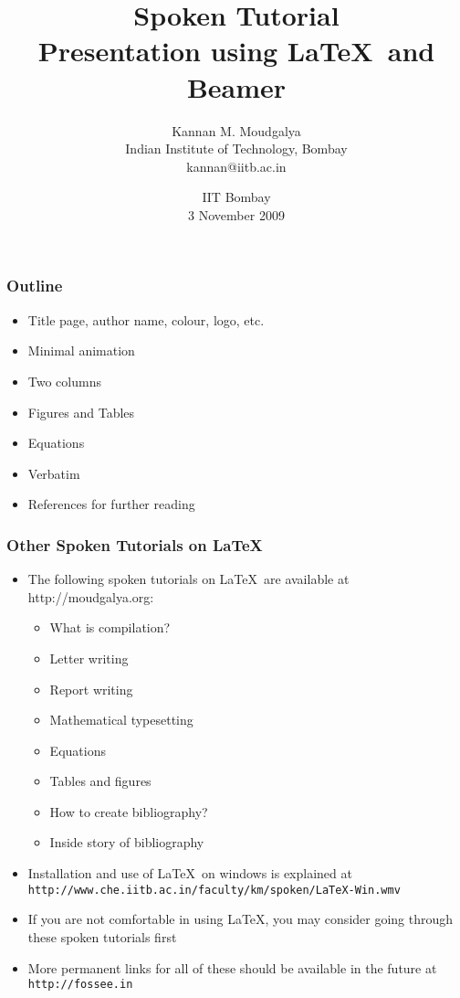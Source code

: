 \documentclass[]{beamer}
\begin{document}
\title
{Spoken Tutorial \\ Presentation using \LaTeX\ and
  Beamer}
\author
{Kannan M. Moudgalya \\
  Indian Institute of Technology, Bombay \\
  kannan@iitb.ac.in}
\date{IIT Bombay \\
  3 November 2009}

\begin{frame}
   \titlepage
\end{frame}

\begin{frame}
\frametitle{Outline}
\begin{itemize}
\item Title page, author name, colour, logo, etc.
\item Minimal animation
\item Two columns
\item Figures and Tables
\item Equations
\item Verbatim
\item References for further reading
\end{itemize}
\end{frame}

\begin{frame}
\frametitle{Other Spoken Tutorials on  \LaTeX}
\begin{itemize}
\item The following spoken tutorials
  on \LaTeX\ are available at
  {\color{magenta}http://moudgalya.org}:
\begin{itemize}
\item What is compilation?
\item Letter writing
\item Report writing
\item Mathematical typesetting
\item Equations
\item Tables and figures
\item How to create bibliography?
\item Inside story of bibliography
\end{itemize}
\item Installation and use of \LaTeX\ on windows
  is explained at
{\color{magenta} \small \tt http://www.che.iitb.ac.in/faculty/km/spoken/LaTeX-Win.wmv}
\item If you are not comfortable in using \LaTeX,
  you may consider going through these spoken
  tutorials first
\item More permanent links for all of these should
  be available in the future at {\color{magenta}
    \tt http://fossee.in}
\end{itemize}
\end{frame}
\end{document}
